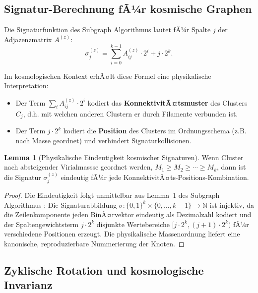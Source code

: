 ﻿\documentclass[a4paper,12pt]{article}
\theoremstyle{definition}
\newtheorem{lemma}{Lemma}[section]
\theoremstyle{remark}
\begin{document}
\subsection{Signatur-Berechnung fÃ¼r kosmische Graphen}

Die Signaturfunktion des Subgraph Algorithmus \cite{eppsubgraph2026} lautet
fÃ¼r Spalte $j$ der Adjazenzmatrix $A^{(z)}$:
\begin{equation}
  \label{eq:sig_cosmic}
  \sigma_j^{(z)} = \sum_{i=0}^{k-1} A^{(z)}_{ij} \cdot 2^i + j \cdot 2^k.
\end{equation}

Im kosmologischen Kontext erhÃ¤lt diese Formel eine physikalische Interpretation:

\begin{itemize}
  \item Der Term $\sum_{i} A^{(z)}_{ij} \cdot 2^i$ kodiert das
    \textbf{KonnektivitÃ¤tsmuster} des Clusters $C_j$, d.h. mit welchen anderen
    Clustern er durch Filamente verbunden ist.
  \item Der Term $j \cdot 2^k$ kodiert die \textbf{Position} des Clusters im
    Ordnungsschema (z.B. nach Masse geordnet) und verhindert Signaturkollisionen.
\end{itemize}

\begin{lemma}[Physikalische Eindeutigkeit kosmischer Signaturen]
  \label{lem:eindeutigkeit_kosmisch}
  Wenn Cluster nach absteigender Virialmassse geordnet werden,
  $M_1 \geq M_2 \geq \cdots \geq M_k$, dann ist die Signatur
  $\sigma_j^{(z)}$ eindeutig fÃ¼r jede KonnektivitÃ¤ts-Positions-Kombination.
\end{lemma}

\begin{proof}
  Die Eindeutigkeit folgt unmittelbar aus Lemma~1 des Subgraph Algorithmus
  \cite{eppsubgraph2026}: Die Signaturabbildung
  $\sigma: \{0,1\}^k \times \{0,\ldots,k-1\} \to \mathbb{N}$ ist injektiv,
  da die Zeilenkomponente jeden BinÃ¤rvektor eindeutig als Dezimalzahl kodiert
  und der Spaltengewichtsterm $j \cdot 2^k$ disjunkte Wertebereiche
  $[j \cdot 2^k, (j+1)\cdot 2^k)$ fÃ¼r verschiedene Positionen erzeugt.
  Die physikalische Massenordnung liefert eine kanonische, reproduzierbare
  Nummerierung der Knoten.
\end{proof}

\subsection{Zyklische Rotation und kosmologische Invarianz}
\end{document}
